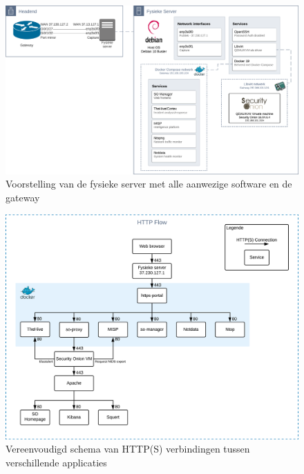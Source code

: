 \documentclass[a4paper,12pt]{report}
\begin{document}
\begin{figure}[H]
  \centering
  \includegraphics[width=\textwidth]{aangepast-systeem-schema-server}
  \caption{Voorstelling van de fysieke server met alle aanwezige software en de gateway}
  \label{fig:aangepast-systeem-schema-server}
\end{figure}

\begin{figure}[H]
  \centering
  \includegraphics[width=\textwidth]{aangepast-systeem-schema-http}
  \caption{Vereenvoudigd schema van HTTP(S) verbindingen tussen verschillende applicaties}
  \label{fig:aangepast-systeem-schema-http}
\end{figure}
\end{document}
